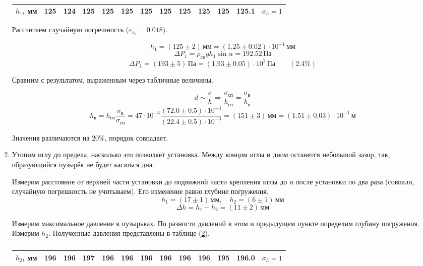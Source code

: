 \documentclass[a4paper,12pt]{article} %
\begin{document}
\begin{enumerate}
  \begin{table}[h!]
    \centering
    \begin{tabular}{|c|cccccccccc|c|c|}
      \hline
      $h_1$, мм & 125 & 124 & 125 & 125 & 125 & 125 & 125 & 125 & 125 & 125 & 125.1 & $\sigma_h = 1$ \\
      \hline
    \end{tabular}
    \caption{}
    \label{tab:water1}
  \end{table}

  Рассчитаем случайную погрешность ($\varepsilon_{h_1} = 0.018$).

  \[
    h_1 = (125 \pm 2) \, \text{мм} = (1.25 \pm 0.02) \cdot 10^{-1} \, \text{мм}
  \]
  \[
    \Delta P_1 = \rho_\text{сп} g h_1 \sin{\alpha} = 192.52 \, \text{Па} 
  \]
  \[
    \Delta P_1 = (193 \pm 5) \, \text{Па} = (1.93 \pm 0.05) \cdot 10^{2} \, \text{Па} \qquad (2.4 \%)
  \]

  Сравним с результатом, выраженным через табличные величины.

  \[
    d \sim \frac{\sigma}{h} \Longrightarrow \frac{\sigma_\text{сп}}{h_\text{сп}} = \frac{\sigma_\text{в}}{h_\text{в}} 
  \]
  \[
     h_\text{в} = h_\text{сп} \frac{\sigma_\text{в}}{\sigma_\text{сп}} = 47 \cdot 10^{-3} \frac{(72.0 \pm 0.5) \cdot 10^{-3}}{(22.4 \pm 0.5) \cdot 10^{-3}} = (151 \pm 3) \, \text{мм} = (1.51 \pm 0.03) \cdot 10^{-1} \, \text{м}
  \]

  Значения различаются на $20 \%$, порядок совпадает. 

  \item Утопим иглу до предела, насколько это позволяет установка. Между концом иглы и дном останется небольшой зазор, так, образующийся пузырёк не будет касаться дна.

  Измерим расстояние от верхней части установки до подвижной части крепления иглы до и после установки по два раза (совпали, случайную погрешность не учитываем). Его изменение равно глубине погружения.
  \[
    h_1 = (17 \pm 1) \, \text{мм}, \quad h_2 = (6 \pm 1) \, \text{мм}
  \]
  \[
    \Delta h = h_1 - h_2 = (11 \pm 2) \, \text{мм}
  \]

  Измерим максимальное давление в пузырьках. По разности давлений в этом и предыдущем пункте определим глубину погружения. Измерим $h_2$. Полученные давления представлены в таблице (\ref{tab:water2}).

  \begin{table}[h!]
    \centering
    \begin{tabular}{|c|cccccccccc|c|c|}
      \hline
      $h_2$, мм & 196 & 196 & 197 & 196 & 196 & 196 & 196 & 196 & 196 & 195 & 196.0 & $\sigma_h = 1$ \\
      \hline
    \end{tabular}
    \caption{}
    \label{tab:water2}
  \end{table}


\end{enumerate}
\end{document}
